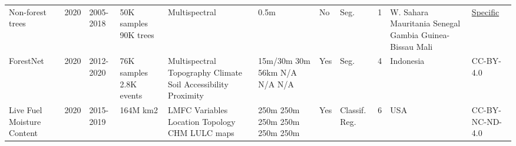 \documentclass{CUP-JNL-DTM}%
\theoremstyle{definition}
\numberwithin{equation}{section}
\begin{document}
\begin{table*}[ht]
{\begin{fntable}
\begin{tabular}{p{1.5cm} | p{0.4cm} | p{1cm} | p{1.3cm} | p{1.2cm} : p{1cm} | p{0.4cm} | p{0.7cm} | p{0.8cm} | p{1cm} | p{1.1cm}}
Non-forest trees \cite{brandt_unexpectedly_2020}  & 2020 & 2005-2018 & 50K samples \newline 90K trees & Multispectral & 0.5m & No & Seg. & 1 & W. Sahara \newline Mauritania \newline Senegal \newline Gambia \newline Guinea-Bissau \newline Mali & \href{https://www.earthdata.nasa.gov/learn/use-data/data-use-policy?}{Specific} \\

ForestNet \cite{irvin_forestnet_2020} & 2020 & 2012-2020 & 76K samples \newline 2.8K events & Multispectral \newline Topography \newline Climate \newline Soil \newline Accessibility \newline Proximity & 15m/30m \newline 30m \newline 56km \newline N/A \newline N/A \newline N/A & Yes & Seg. & 4 & Indonesia & CC-BY-4.0 \\

Live Fuel Moisture Content \cite{rao_sar-enhanced_2020} & 2020 & 2015-2019 & 164M km2 & LMFC \newline Variables \newline Location \newline Topology \newline CHM \newline LULC maps & 250m \newline 250m \newline 250m \newline 250m \newline 250m \newline 250m & Yes & Classif. \newline Reg. & 6 & USA & CC-BY-NC-ND-4.0 \\


\bottomrule

\end{tabular}
\end{fntable}}
\label{tab:satellite1}
\end{table*}
\end{document}
